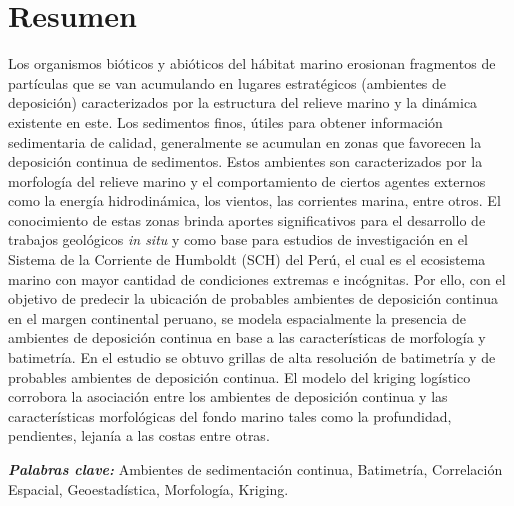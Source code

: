 {\centering \section*{Resumen}}
\singlespace Los organismos bióticos y abióticos del hábitat marino erosionan fragmentos de partículas que se van acumulando en lugares estratégicos (ambientes de deposición) caracterizados por la estructura del relieve marino y la dinámica existente en este. Los sedimentos finos, útiles para obtener información sedimentaria de calidad, generalmente se acumulan en zonas que favorecen la deposición continua de sedimentos.  Estos ambientes son caracterizados por la morfología del relieve marino y el comportamiento de ciertos agentes externos como la energía hidrodinámica, los vientos, las corrientes marina, entre otros. El conocimiento de estas zonas brinda aportes significativos para el desarrollo de trabajos geológicos \textit{in situ} y como base para estudios de investigación en el Sistema de la Corriente de Humboldt (SCH) del Perú, el cual es el ecosistema marino con mayor cantidad de condiciones extremas e incógnitas. Por ello, con el objetivo de predecir la ubicación de probables ambientes de deposición continua en el margen continental peruano, se modela espacialmente la presencia de ambientes de deposición continua en base a las características de morfología y batimetría. En el estudio se obtuvo grillas de alta resolución de batimetría  y de probables ambientes de deposición continua.  El modelo del kriging logístico corrobora la asociación entre los ambientes de deposición continua y las características morfológicas del fondo marino tales como la profundidad, pendientes, lejanía a las costas entre otras.

\noindent\textbf{\textit{Palabras clave:}} Ambientes de sedimentación continua, Batimetría, Correlación Espacial, Geoestadística, Morfología, Kriging.\\

